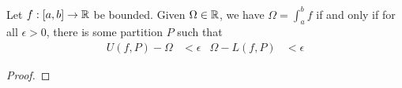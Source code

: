 \documentclass[../main.tex]{subfiles}
\begin{document}
\begin{lemma}\label{lem:13.20}
    Let $f:[a,b]\to\mathbb{R}$ be bounded. Given $\Omega\in\mathbb{R}$, we have $\Omega=\int_a^bf$ if and only if for all $\epsilon>0$, there is some partition $P$ such that
    \begin{align*}
        U(f,P)-\Omega &< \epsilon&
        \Omega-L(f,P) &< \epsilon
    \end{align*}
    \begin{proof}


\end{proof}
\end{lemma}
\end{document}
